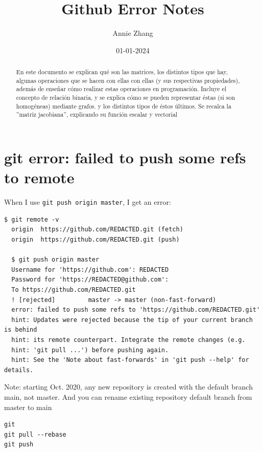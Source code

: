 \documentclass[10pt]{article}
\title{Github Error Notes}
\author{Annie Zhang}
\date{01-01-2024}
\begin{document}
\maketitle \tableofcontents 


\begin{abstract}
En este documento se explican qué son las matrices, los distintos tipos que hay, algunas operaciones que se hacen con ellas con ellas (y sus respectivas propiedades), además de enseñar cómo realizar estas operaciones en programación. Incluye el concepto de relación binaria, y se explica cómo se pueden representar éstas (si son homogéneas) mediante grafos. y los distintos tipos de éstos últimos. Se recalca la ''matriz jacobiana'', explicando su función escalar y vectorial
\end{abstract}

\section{git error: failed to push some refs to remote}
When I use \texttt{git push origin master}, I get an error:
\begin{center}
\begin{lstlisting}[caption=Error message example]
  $ git remote -v
  origin  https://github.com/REDACTED.git (fetch)
  origin  https://github.com/REDACTED.git (push)
  
  $ git push origin master
  Username for 'https://github.com': REDACTED
  Password for 'https://REDACTED@github.com':
  To https://github.com/REDACTED.git
  ! [rejected]         master -> master (non-fast-forward)
  error: failed to push some refs to 'https://github.com/REDACTED.git'
  hint: Updates were rejected because the tip of your current branch is behind
  hint: its remote counterpart. Integrate the remote changes (e.g.
  hint: 'git pull ...') before pushing again.
  hint: See the 'Note about fast-forwards' in 'git push --help' for details.
  \end{lstlisting}
\end{center}

Note: starting Oct. 2020, any new repository is created with the default branch main, not master. And you can rename existing repository default branch from master to main 

\begin{center}
\begin{lstlisting}[caption=commands to fix]git 
git pull --rebase
git push
\end{lstlisting}
\end{center}
\end{document}
